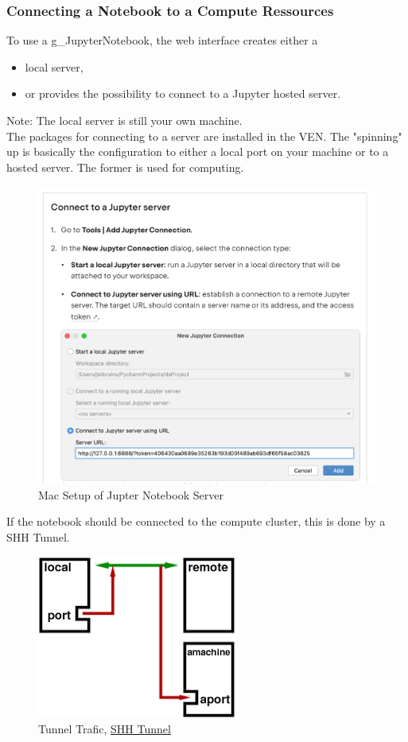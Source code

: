 \subsubsection{Connecting a Notebook to a Compute Ressources}
To use a \gls{g_JupyterNotebook}, the web interface creates either a
\begin{itemize}
	\item local server,
	\item or provides the possibility to connect to a Jupyter hosted server.
\end{itemize}
Note: The local server is still your own machine.\\

The packages for connecting to a server are installed in the \gls{VEN}. The "spinning" up is basically the configuration to either a local port on your machine or to a hosted server. The former is used for computing.

\begin{figure}[H]
	\centering
	\includegraphics[scale = 0.3]{attachment/chapter_AML/Scc008}
	\caption{Mac Setup of Jupter Notebook Server}
\end{figure}

If the notebook should be connected to the compute cluster, this is done by a SHH Tunnel.

\begin{figure}[H]
	\centering
	\includegraphics[scale = 0.3]{attachment/chapter_AML/Scc010}
	\caption{Tunnel Trafic, \href{https://radcamp.github.io/AF-Biota/Jupyter_Notebook_Setup.html}{SHH Tunnel}}
\end{figure}